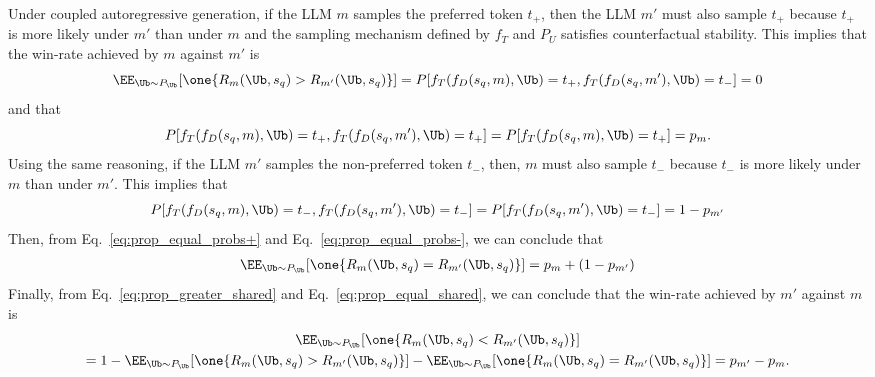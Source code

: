 %
Under coupled autoregressive generation, if the LLM $m$ samples the preferred token $t_+$, then the LLM $m'$ must also sample $t_{+}$ because $t_{+}$ is more likely under $m'$ than under $m$ and the sampling mechanism defined by $f_T$ and $P_U$ satisfies counterfactual stability. 
%
This implies that the win-rate achieved by $m$ against $m'$ is
%
    \begin{equation}\label{eq:prop_greater_shared}
            \EE_{\Ub\sim P_{\Ub}} [\one\{R_m(\Ub,s_q)>R_{m'}(\Ub,s_q)\}] =
            \PP[f_T(f_D(s_q, m),\Ub)= t_+, f_T(f_D(s_q, m'),\Ub)= t_-]=0 
    \end{equation}
and that
    \begin{equation}\label{eq:prop_equal_probs+}
            \PP[f_T(f_D(s_q, m),\Ub)= t_+, f_T(f_D(s_q, m'),\Ub)= t_+]= \PP[f_T(f_D(s_q, m),\Ub)= t_+] =p_m.
    \end{equation}
%
Using the same reasoning, if the LLM $m'$ samples the non-preferred token $t_{-}$, then, $m$ must also sample $t_{-}$ because $t_{-}$ is more likely under $m$ than under $m'$. This implies that
%
    \begin{equation}\label{eq:prop_equal_probs-}
            \PP[f_T(f_D(s_q, m),\Ub)= t_-, f_T(f_D(s_q, m'),\Ub)= t_-]= \PP[f_T(f_D(s_q, m'),\Ub)= t_-] = 1-p_{m'}
    \end{equation} 
%
Then, from Eq.~\ref{eq:prop_equal_probs+} and Eq.~\ref{eq:prop_equal_probs-}, we can conclude that
%
    \begin{equation}\label{eq:prop_equal_shared}
        \begin{aligned}
            \EE_{\Ub\sim P_{\Ub}} [\one\{R_m(\Ub,s_q)=R_{m'}(\Ub,s_q)\}] = p_m + (1-p_{m'})
        \end{aligned}
    \end{equation}
%
Finally, from Eq.~\ref{eq:prop_greater_shared} and Eq.~\ref{eq:prop_equal_shared}, we can conclude that the win-rate achieved by $m'$ against $m$ is
%
\begin{multline*}
    \EE_{\Ub\sim P_{\Ub}} [\one\{R_m(\Ub,s_q)<R_{m'}(\Ub,s_q)\}] \\
        = 1 - \EE_{\Ub\sim P_{\Ub}} [\one\{R_m(\Ub,s_q)>R_{m'}(\Ub,s_q)\}] -\EE_{\Ub\sim P_{\Ub}} [\one\{R_m(\Ub,s_q)=R_{m'}(\Ub,s_q)\}] = p_{m'}-p_m.
\end{multline*}


